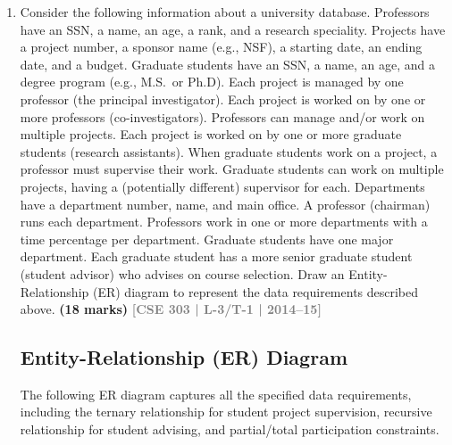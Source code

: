 \documentclass[12pt,a3paper]{article}
\newcommand{\yr}[1]{\hfill\textcolor{gray}{\small\textbf{[#1]}}}
\newcommand{\mk}[1]{\textcolor{orange!70!black}{\small\textbf{(#1 marks)}}}
\begin{document}
\begin{enumerate}
\begin{tcolorbox}[enhanced,breakable,ansbox,colback=cA!4,colframe=cA,boxrule=0.8pt,arc=5pt,title={\textbf{Answer}},fonttitle=\bfseries\color{white},colbacktitle=cA]
\end{tcolorbox}

\item Consider the following information about a university database. Professors have an SSN, a name, an age, a rank, and a research speciality. Projects have a project number, a sponsor name (e.g., NSF), a starting date, an ending date, and a budget. Graduate students have an SSN, a name, an age, and a degree program (e.g., M.S.\ or Ph.D). Each project is managed by one professor (the principal investigator). Each project is worked on by one or more professors (co-investigators). Professors can manage and/or work on multiple projects. Each project is worked on by one or more graduate students (research assistants). When graduate students work on a project, a professor must supervise their work. Graduate students can work on multiple projects, having a (potentially different) supervisor for each. Departments have a department number, name, and main office. A professor (chairman) runs each department. Professors work in one or more departments with a time percentage per department. Graduate students have one major department. Each graduate student has a more senior graduate student (student advisor) who advises on course selection.
Draw an Entity-Relationship (ER) diagram to represent the data requirements described above.
\mk{18} \yr{CSE 303 | L-3/T-1 | 2014--15}

\begin{tcolorbox}[enhanced,breakable,ansbox,colback=cA!4,colframe=cA,boxrule=0.8pt,arc=5pt,title={\textbf{Answer}},fonttitle=\bfseries\color{white},colbacktitle=cA]

\subsection*{Entity-Relationship (ER) Diagram}

The following ER diagram captures all the specified data requirements, including the ternary relationship for student project supervision, recursive relationship for student advising, and partial/total participation constraints.

\vspace{1.5em}
\begin{center}
\begin{tikzpicture}[
    x=1cm, y=1cm,
    entity/.style={draw, rectangle, rounded corners, minimum width=3cm, minimum height=1.2cm, align=center, fill=white, thick, font=\bfseries},
    relationship/.style={draw, diamond, aspect=1.5, minimum width=2.5cm, minimum height=1.2cm, align=center, fill=white, thick},
    attribute/.style={draw, ellipse, minimum width=1.5cm, minimum height=0.7cm, align=center, fill=white, font=\scriptsize, thick},
    every node/.style={font=\small}
]


\end{tikzpicture}
\end{center}
\end{tcolorbox}
\end{enumerate}
\end{document}
